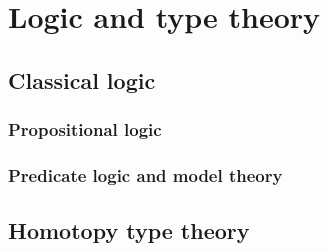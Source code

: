 \documentclass[12pt]{report}
\theoremstyle{definition}
\begin{document}
\part{Logic and type theory}\label{part:logic-type-theory}
\chapter{Classical logic}
\section{Propositional logic}
\section{Predicate logic and model theory}

\chapter{Homotopy type theory}

\printindex
\printbibliography%
\end{document}
